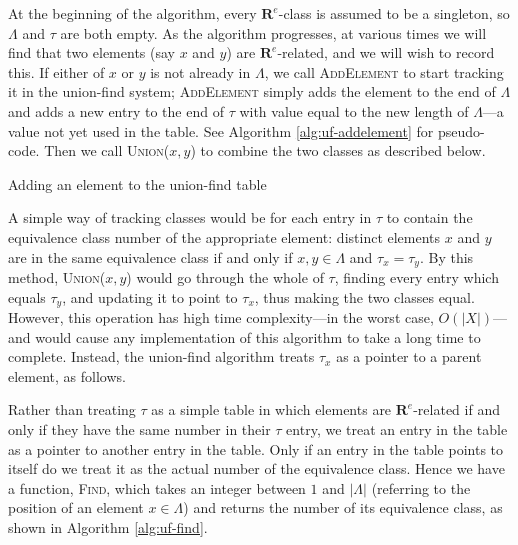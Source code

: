 At the beginning of the algorithm, every $\mathbf{R}^e$-class is assumed to be a
singleton, so $\Lambda$ and $\tau$ are both empty.  As the algorithm progresses,
at various times we will find that two elements (say $x$ and $y$) are
$\mathbf{R}^e$-related, and we will wish to record this.  If either of $x$ or
$y$ is not already in $\Lambda$, we call \textsc{AddElement} to start tracking
it in the union-find system; \textsc{AddElement} simply adds the element to the
end of $\Lambda$ and adds a new entry to the end of $\tau$ with value equal to
the new length of $\Lambda$---a value not yet used in the table.  See Algorithm
\ref{alg:uf-addelement} for pseudo-code.  Then we call \textsc{Union($x,y$)} to
combine the two classes as described below.

\begin{algorithm}
\caption{Adding an element to the union-find table}
\label{alg:uf-addelement}
  \begin{algorithmic}
    \EndProcedure
  \end{algorithmic}
\end{algorithm}

A simple way of tracking classes would be for each entry in $\tau$ to contain
the equivalence class number of the appropriate element: distinct elements $x$
and $y$ are in the same equivalence class if and only if $x,y \in \Lambda$ and
$\tau_x = \tau_y$.  By this method, \textsc{Union($x,y$)} would go through the
whole of $\tau$, finding every entry which equals $\tau_y$, and updating it to
point to $\tau_x$, thus making the two classes equal.  However, this operation
has high time complexity---in the worst case, $O(|X|)$---and would cause any
implementation of this algorithm to take a long time to complete.  Instead, the
union-find algorithm treats $\tau_x$ as a pointer to a parent element, as
follows.

Rather than treating $\tau$ as a simple table in which elements are
$\mathbf{R}^e$-related if and only if they have the same number in their $\tau$
entry, we treat an entry in the table as a pointer to another entry in the
table.  Only if an entry in the table points to itself do we treat it as the
actual number of the equivalence class.  Hence we have a function,
\textsc{Find}, which takes an integer between $1$ and $|\Lambda|$ (referring to
the position of an element $x \in \Lambda$) and returns the number of its
equivalence class, as shown in Algorithm \ref{alg:uf-find}.

